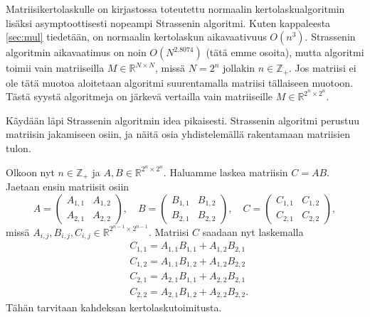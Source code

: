 \documentclass[10pt,a4paper,titlepage]{article}
\newcommand{\Z}{\ensuremath{\mathbb{Z}}}
\newcommand{\R}{\ensuremath{\mathbb{R}}}
\begin{document}
Matriisikertolaskulle on kirjastossa toteutettu normaalin kertolaskualgoritmin lisäksi asymptoottisesti nopeampi Strassenin algoritmi.
Kuten kappaleesta \ref{sec:mul} tiedetään, on normaalin kertolaskun aikavaativuus $O\left( n^3 \right)$. Strassenin algoritmin aikavaatimus
on noin $O\left( N^{2.8074} \right)$ (tätä emme osoita), mutta algoritmi toimii vain matriiseilla $M\in\R^{N\times N}$, missä $N = 2^n$ jollakin $n\in\Z_+$.
Jos matriisi ei ole tätä muotoa aloitetaan algoritmi suurentamalla matriisi tällaiseen muotoon.
Tästä syystä algoritmeja on järkevä vertailla vain matriiseille $M\in\R^{2^n \times 2^n}$.

Käydään läpi Strassenin algoritmin idea pikaisesti. Strassenin algoritmi perustuu matriisin jakamiseen osiin, ja näitä osia yhdistelemällä rakentamaan matriisien tulon.

Olkoon nyt $n\in\Z_+$ ja $A,B\in\R^{2^n\times2^n}$. Haluamme laskea matriisin $C = AB$. Jaetaan ensin matriisit osiin
$$
A = 
\begin{pmatrix}
A_{1,1} & A_{1,2} \\
A_{2,1} & A_{2,2}
\end{pmatrix}, \quad
B = 
\begin{pmatrix}
B_{1,1} & B_{1,2} \\
B_{2,1} & B_{2,2}
\end{pmatrix}, \quad
C = 
\begin{pmatrix}
C_{1,1} & C_{1,2} \\
C_{2,1} & C_{2,2}
\end{pmatrix},
$$
missä $A_{i,j}, B_{i,j}, C_{i,j} \in\R^{2^{n-1}\times2^{n-1}}$.
Matriisi $C$ saadaan nyt laskemalla
\begin{align*}
&C_{1,1} = A_{1,1}B_{1,1} + A_{1,2}B_{2,1} \\
&C_{1,2} = A_{1,1}B_{1,2} + A_{1,2}B_{2,2} \\
&C_{2,1} = A_{2,1}B_{1,1} + A_{2,2}B_{2,1} \\
&C_{2,2} = A_{2,1}B_{1,2} + A_{2,2}B_{2,2}.
\end{align*}
Tähän tarvitaan kahdeksan kertolaskutoimitusta.
\end{document}
